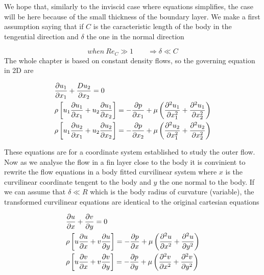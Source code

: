 	We hope that, similarly to the inviscid case where equations simplifies, the case will be here because of the small thickness of the boundary layer. We make a first assumption saying that if $C$ is the caracteristic length of the body in the tengential direction and $\delta$ the one in the normal direction

	\begin{equation}
		when \ Re_C \gg 1 \qquad \Rightarrow \delta \ll C
	\end{equation}
	The whole chapter is based on constant density flows, so the governing equation in 2D are
	
	\begin{equation}
	\begin{aligned}
		&\frac{\D u_1}{\D x_1} + \frac{D u_2}{\D x_2} = 0\\
		&\rho \left[ u_1 \frac{\D u_1}{\D x_1} + u_2 \frac{\D u_1}{\D x_2} \right] = -\frac{\D p}{\D x_1} + \mu \left( \frac{\D ^2 u_1}{\D x_1^2} + \frac{\D ^2 u_1}{\D x_2^2} \right) \\
		&\rho \left[ u_1 \frac{\D u_2}{\D x_1} + u_2 \frac{\D u_2}{\D x_2} \right] = -\frac{\D p}{\D x_2} + \mu \left( \frac{\D ^2 u_2}{\D x_1^2} + \frac{\D ^2 u_2}{\D x_2^2} \right)
	\end{aligned}
	\end{equation}
	
	These equations are for a coordinate system established to study the outer flow. Now as we analyse the flow in a fin layer close to the body it is convinient to rewrite the flow equations in a body fitted curvilinear system where $x$ is the curvilinear coordinate tengent to the body and $y$ the one normal to the body. If we can assume that $\delta \ll R$ which is the body radius of curvature (variable), the transformed curvilinear equations are identical to the original cartesian equations
	
	\begin{equation}
		\begin{aligned}
		&\frac{\D u}{\D x} + \frac{\D v}{\D y} = 0\\
		&\rho \left[ u \frac{\D u}{\D x} + v \frac{\D u}{\D y} \right] = -\frac{\D p}{\D x} + \mu \left( \frac{\D ^2 u}{\D x^2} + \frac{\D ^2 u}{\D y^2} \right) \\
		&\rho \left[ u \frac{\D v}{\D x} + v \frac{\D v}{\D y} \right] = -\frac{\D p}{\D y} + \mu \left( \frac{\D ^2 v}{\D x^2} + \frac{\D ^2 v}{\D y^2} \right)
	\end{aligned}
	\end{equation}
	
